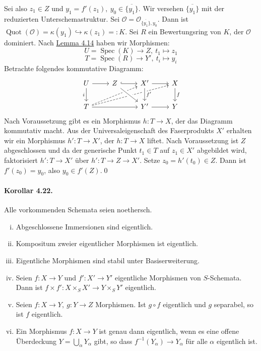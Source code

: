 \begin{itemize}
Sei also $z_1\in Z$ und $y_1=f'(z_1),\ y_0\in\overline{\{y_1\}}$. Wir versehen $\overline{\{y_1\}}$ mit der reduzierten Unterschemastruktur. Sei $\mathcal{O}=\mathcal{O}_{\overline{\{y_1\}},y_0 }$. Dann ist $\operatorname{Quot}(\mathcal{O})=\kappa(y_1)\hookrightarrow \kappa(z_1)=:K$.  Sei $R$ ein Bewertungsring von $K$, der $\mathcal{O}$ dominiert. Nach \hyperref[4.14]{Lemma 4.14} haben wir Morphismen:
\[U=\operatorname{Spec}(K)\to Z,\ t_1\mapsto z_1 \]
\[T=\operatorname{Spec}(R)\to Y',\ t_i\mapsto y_i \]
Betrachte folgendes kommutative Diagramm:
\[\begin{tikzcd}
U\ar[r] \ar[d, "i"'] & Z\ar[r, hook] & X'\ar[r]& X\ar[d, "f"]\\
T\ar[rr]\ar[rrru, dashed]\ar[rru, dashed] & & Y'\ar[r]\ar[from=u, "f'", crossing over]\ar[from=ul, crossing over] & Y
\end{tikzcd} \]
Nach Voraussetzung gibt es ein Morphismus $h:T\to X$, der das Diagramm kommutativ macht. Aus der Universaleigenschaft des Faserprodukts $X'$ erhalten wir ein Morphismus $h':T\to X'$, der $h:T\to X$ liftet. Nach Voraussetzung ist $Z$ abgeschlossen und da der generische Punkt $t_1\in T$ auf $z_1\in X'$ abgebildet wird, faktorisiert $h':T\to X'$ über $h':T\to Z\to X'$. Setze $z_0=h'(t_0)\in Z$. Dann ist $f'(z_0)=y_0$, also $y_0\in f'(Z)$.\qed
\end{itemize}

\paragraph{Korollar 4.22.}\label{4.22} Alle vorkommenden Schemata seien noethersch. \begin{enumerate}[(i)]
\item Abgeschlossene Immersionen sind eigentlich.
\item Kompositum zweier eigentlicher Morphismen ist eigentlich.
\item Eigentliche Morphismen sind stabil unter Basiserweiterung.
\item Seien $f:X\to Y$ und $f':X'\to Y'$ eigentliche Morphismen von $S$-Schemata. Dann ist $f\times f':X\times_SX'\to Y\times_SY'$ eigentlich.
\item Seien $f:X\to Y,\ g:Y\to Z$ Morphismen. Ist $g\circ f$ eigentlich und $g$ separabel, so ist $f$ eigentlich.
\item Ein Morphismus $f:X\to Y$ ist genau dann eigentlich, wenn es eine offene Ü\-ber\-deckung $Y=\bigcup_\alpha Y_\alpha$ gibt, so dass $f^{-1}(Y_\alpha)\to Y_\alpha$ für alle $\alpha$ eigentlich ist.
\end{enumerate}

